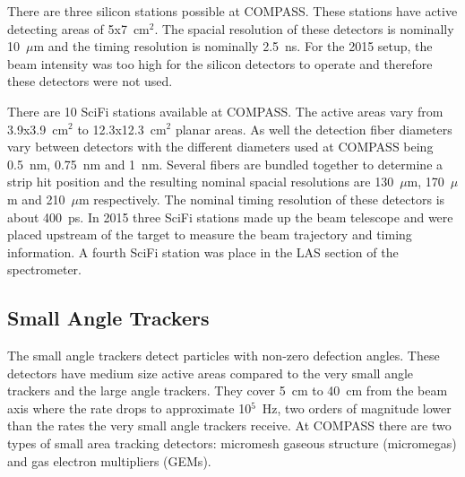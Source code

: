 There are three silicon stations possible at COMPASS.  These stations have
active detecting areas of 5x7~cm$^2$.  The spacial resolution of these detectors
is nominally 10~$\mu$m and the timing resolution is nominally 2.5~ns.  For the
2015 setup, the beam intensity was too high for the silicon detectors to operate
and therefore these detectors were not used. \par

There are 10 SciFi stations available at COMPASS.  The active areas vary from
3.9x3.9~cm$^2$ to 12.3x12.3~cm$^2$ planar areas.  As well the detection fiber
diameters vary between detectors with the different diameters used at COMPASS
being 0.5~nm, 0.75~nm and 1~nm.  Several fibers are bundled together to
determine a strip hit position and the resulting nominal spacial resolutions are
130~$\mu$m, 170~$\mu$m and 210~$\mu$m respectively.  The nominal timing
resolution of these detectors is about 400~ps.  In 2015 three SciFi stations
made up the beam telescope and were placed upstream of the target to measure the
beam trajectory and timing information.  A fourth SciFi station was place in the
LAS section of the spectrometer. \par

\subsection{Small Angle Trackers} \label{sec::SAT}
The small angle trackers detect particles with non-zero defection angles. These
detectors have medium size active areas compared to the very small angle
trackers and the large angle trackers.  They cover 5~cm to 40~cm from the beam
axis where the rate drops to approximate 10$^5$~Hz, two orders of magnitude
lower than the rates the very small angle trackers receive.  At COMPASS there
are two types of small area tracking detectors: micromesh gaseous structure
(micromegas) and gas electron multipliers (GEMs). \par

